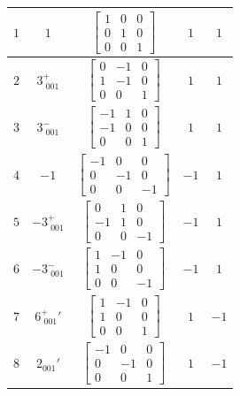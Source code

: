 \documentclass[fleqn,8pt]{jsarticle}
\begin{document}
\begin{longtable}{ccccc}
$ 1 $ & $ 1 $ & $ \begin{bmatrix} 1 & 0 & 0 \\ 0 & 1 & 0 \\ 0 & 0 & 1 \end{bmatrix} $ & $ 1 $ & $ 1 $ \\ \hline
$ 2 $ & $ 3^{+}_{\,\,001} $ & $ \begin{bmatrix} 0 & -1 & 0 \\ 1 & -1 & 0 \\ 0 & 0 & 1 \end{bmatrix} $ & $ 1 $ & $ 1 $ \\ \hline
$ 3 $ & $ 3^{-}_{\,\,001} $ & $ \begin{bmatrix} -1 & 1 & 0 \\ -1 & 0 & 0 \\ 0 & 0 & 1 \end{bmatrix} $ & $ 1 $ & $ 1 $ \\ \hline
$ 4 $ & $ -1 $ & $ \begin{bmatrix} -1 & 0 & 0 \\ 0 & -1 & 0 \\ 0 & 0 & -1 \end{bmatrix} $ & $ -1 $ & $ 1 $ \\ \hline
$ 5 $ & $ -3^{+}_{\,\,001} $ & $ \begin{bmatrix} 0 & 1 & 0 \\ -1 & 1 & 0 \\ 0 & 0 & -1 \end{bmatrix} $ & $ -1 $ & $ 1 $ \\ \hline
$ 6 $ & $ -3^{-}_{\,\,001} $ & $ \begin{bmatrix} 1 & -1 & 0 \\ 1 & 0 & 0 \\ 0 & 0 & -1 \end{bmatrix} $ & $ -1 $ & $ 1 $ \\ \hline
$ 7 $ & $ 6^{+}_{\,\,001}{}' $ & $ \begin{bmatrix} 1 & -1 & 0 \\ 1 & 0 & 0 \\ 0 & 0 & 1 \end{bmatrix} $ & $ 1 $ & $ -1 $ \\ \hline
$ 8 $ & $ 2{}_{001}{}' $ & $ \begin{bmatrix} -1 & 0 & 0 \\ 0 & -1 & 0 \\ 0 & 0 & 1 \end{bmatrix} $ & $ 1 $ & $ -1 $ \\ \hline

\end{longtable}
\end{document}
